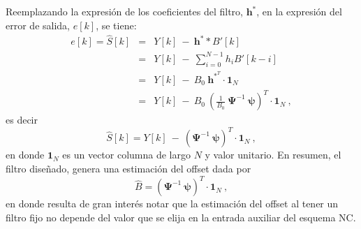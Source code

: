 Reemplazando la expresión de los coeficientes del filtro, $\bm h^*$, en la expresión del error de salida, $e[k]$, se tiene:
\begin{eqnarray*}
 e[k]=\hat{S}[k] &=& Y[k]~-~\bm{h}^*\ast B'[k] \\
&=& Y[k] ~-~ \sum_{i=0}^{N-1}h_i B'[k-i]\\
&=& Y[k] ~-~ B_0 ~\bm h^{*^T} \cdot\bm1_N\\
&=&Y[k] ~-~ B_0 \bm ~\left(\frac{1}{B_0}~\bm{\Psi}^{-1}~\bm{\psi}\right)^T \cdot\bm1_N~,
\end{eqnarray*}
es decir
\begin{equation}
 \hat{S}[k] = Y[k] ~-~ \left(\bm{\Psi}^{-1}~\bm{\psi}\right) ^T\cdot\bm1_N~,
\end{equation}
en donde $\bm1_N$ es un vector columna de largo $N$ y valor unitario. En resumen, el filtro diseñado, genera una estimación del offset dada por
\begin{equation}
 \hat{B} = \left(\bm{\Psi}^{-1}~\bm{\psi}\right) ^T\cdot\bm1_N~,
\end{equation}
en donde resulta de gran interés notar que la estimación del offset al tener un filtro fijo no depende del valor que se elija en la entrada auxiliar del esquema \ac{NC}.

